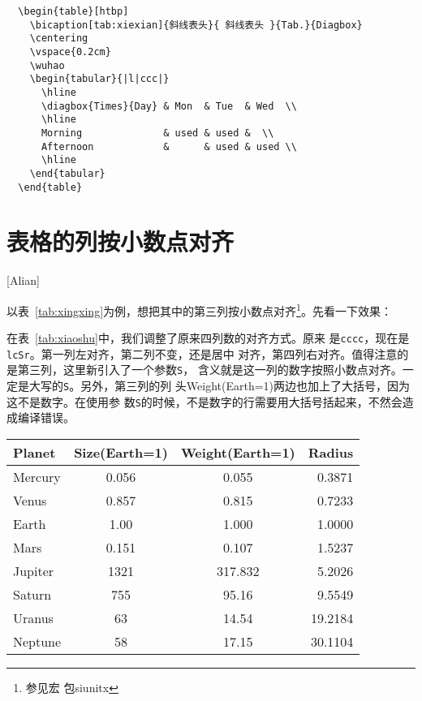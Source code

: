 \begin{lstlisting}
  \begin{table}[htbp]
    \bicaption[tab:xiexian]{斜线表头}{ 斜线表头 }{Tab.}{Diagbox}
    \centering
    \vspace{0.2cm}
    \wuhao
    \begin{tabular}{|l|ccc|}
      \hline
      \diagbox{Times}{Day} & Mon  & Tue  & Wed  \\
      \hline
      Morning              & used & used &  \\
      Afternoon            &      & used & used \\
      \hline
    \end{tabular}
  \end{table}
\end{lstlisting}


\section{表格的列按小数点对齐}[Alian]

以表~\ref{tab:xingxing}为例，想把其中的第三列按小数点对齐\footnote{参见宏
  包siunitx}。先看一下效果：

在表~\ref{tab:xiaoshu}中，我们调整了原来四列数的对齐方式。原来
是\texttt{cccc}，现在是\texttt{lcSr}。第一列左对齐，第二列不变，还是居中
对齐，第四列右对齐。值得注意的是第三列，这里新引入了一个参数\texttt{S}，
含义就是这一列的数字按照小数点对齐。一定是大写的\texttt{S}。另外，第三列的列
头Weight(Earth=1)两边也加上了大括号，因为这不是数字。在使用参
数\texttt{S}的时候，不是数字的行需要用大括号括起来，不然会造成编译错误。

\begin{table}[htbp]
  \centering
  \vspace{0.2cm}
  \wuhao
  \begin{tabular}{lcSr}
    \toprule
    Planet  & Size(Earth=1) & {Weight(Earth=1)} & Radius  \\
    \midrule
    Mercury & 0.056         & 0.055             & 0.3871  \\
    Venus   & 0.857         & 0.815             & 0.7233  \\
    Earth   & 1.00          & 1.000             & 1.0000  \\
    Mars    & 0.151         & 0.107             & 1.5237  \\
    Jupiter & 1321          & 317.832           & 5.2026  \\
    Saturn  & 755           & 95.16             & 9.5549  \\
    Uranus  & 63            & 14.54             & 19.2184 \\
    Neptune & 58            & 17.15             & 30.1104 \\
    \bottomrule
  \end{tabular}
\end{table}

